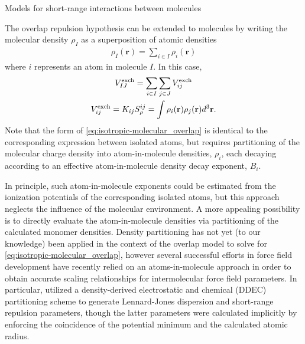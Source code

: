 \begin{subsection}{Models for short-range interactions between molecules}

The overlap repulsion hypothesis can be extended to molecules
\cite{Stone2007,Wheatley1990,Mitchell2000,Soderhjelm2006,Day2003}
by writing the molecular density $\rho_I$ as a superposition of atomic
densities
\begin{align}
\rho_I(\mathbf{r}) = \sum \limits_{i \in I} \rho_i(\mathbf{r})
\end{align}
where $i$ represents an atom in molecule $I$. In this case, 
%
\begin{gather}
V^{\text{exch}}_{IJ} = \sum \limits_{i \in I} \sum \limits_{j \in J} V^{\text{exch}}_{ij} \\
\label{eq:isotropic-molecular_overlap}
V^{\text{exch}}_{ij} = K_{ij}S^{ij}_{\rho} = \int \rho_i(\mathbf{r}) \rho_j(\mathbf{r}) d^3\mathbf{r} .
\end{gather}
%
Note that the form of \cref{eq:isotropic-molecular_overlap} is identical to the
corresponding expression between isolated atoms, but requires partitioning of
the molecular charge density into atom-in-molecule densities, $\rho_i$, each
decaying according to an effective atom-in-molecule density decay exponent,
$B_i$.

In principle, such atom-in-molecule exponents could be estimated from the 
ionization potentials of the corresponding isolated atoms, \cite{McDaniel2013,Rappe1992} 
but this approach neglects the influence of the molecular environment.
A more appealing possibility is to directly evaluate the
atom-in-molecule densities via partitioning of the calculated monomer
densities. Density partitioning has not yet (to our knowledge) been
applied in the context of the overlap model to solve for
\cref{eq:isotropic-molecular_overlap}, 
however
several successful efforts in force field development have recently relied on
an atoms-in-molecule approach in order to obtain accurate scaling
relationships for intermolecular force field parameters.\cite{Tkatchenko2012,Tkatchenko2009,Cole2016}
In particular, \citeauthor{Cole2016} utilized a density-derived electrostatic
and chemical (DDEC) partitioning scheme 
\cite{Manz2010,Manz2012}
to generate Lennard-Jones dispersion and short-range repulsion parameters,
though the latter parameters were calculated implicitly by enforcing the
coincidence of the potential minimum and the calculated atomic radius. 


\end{subsection}
